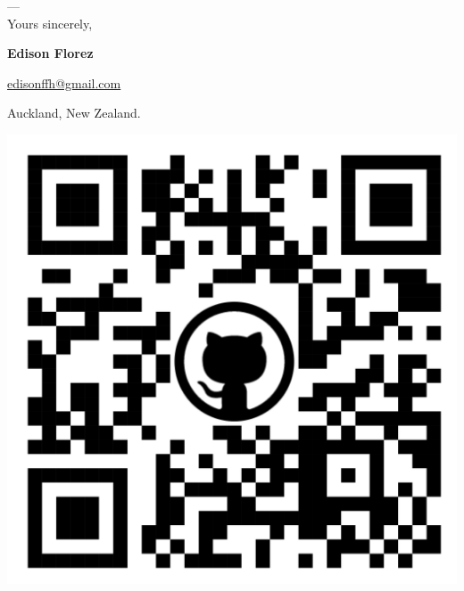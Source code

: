 \vfill
\begin{minipage}[c]{.75\textwidth}
    ---\\
    Yours sincerely,

    \vspace*{4mm}

    \textbf{Edison Florez}

    \href{mailto:edisonffh@gmail.com}{edisonffh@gmail.com}


    Auckland, New Zealand.
\end{minipage}
\begin{minipage}[c]{.2\textwidth}
    \centering
    \href{https://github.com/e-florez/}{
        \includegraphics[scale=0.025]{figs/qrcode_github_page.png}
    }
\end{minipage}
